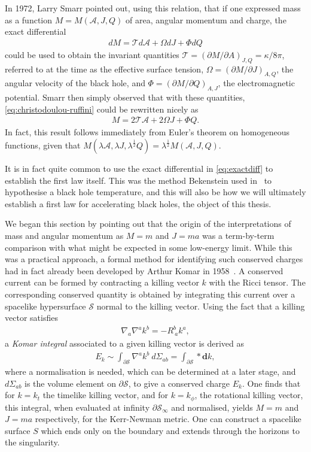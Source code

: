 \documentclass[
twoside,
openright,
frontopenright
]{dmathesis}
\begin{document}
In 1972, Larry Smarr pointed out, using this relation, that if one expressed
mass as a function $M=M(\mathcal{A},J,Q)$ of area, angular momentum and charge,
the exact differential
\begin{align}
  \label{eq:exactdiff}
dM = \mathcal{T}d\mathcal{A} + \Omega dJ + \Phi dQ
\end{align}
could be used to obtain the invariant quantities
$\mathcal{T} = (\partial M/\partial A)_{J,Q} = \kappa/8\pi$, referred to at the
time as the effective surface tension, $\Omega=(\partial M/\partial J)_{A,Q}$,
the angular velocity of the black hole, and
$\Phi = (\partial M/\partial Q)_{A,J}$, the electromagnetic potential. Smarr
then simply observed that with these quantities, \cref{eq:christodoulou-ruffini}
could be rewritten nicely as
\begin{align}
  \label{eq:smarrrelation}
  M = 2\mathcal{T}\mathcal{A} + 2\Omega J + \Phi Q.
\end{align}
In fact, this result follows immediately from Euler's theorem on homogeneous
functions, given that $M(\lambda\mathcal{A}, \lambda J, \lambda^\frac12 Q) =
\lambda^\frac12 M(\mathcal{A},J,Q)$.

It is in fact quite common to use the exact differential in \cref{eq:exactdiff}
to establish the first law itself. This was the method Bekenstein used
in~\cite{Bekenstein:1973ur} to hypothesise a black hole temperature, and this
will also be how we will ultimately establish a first law for accelerating black
holes, the object of this thesis. 

We began this section by pointing out that the origin of the interpretations of
mass and angular momentum as $M = m$ and $J = ma$ was a term-by-term comparison
with what might be expected in some low-energy limit. While this was a practical
approach, a formal method for identifying such conserved charges had in fact
already been developed by Arthur Komar in 1958~\cite{Komar:1959aa}. A conserved
current can be formed by contracting a killing vector $k$ with the Ricci
tensor. The corresponding conserved quantity is obtained by integrating this
current over a spacelike hypersurface $\mathcal{S}$ normal to the killing
vector. Using the fact that a killing vector satisfies
\begin{align}
  \label{eq:killing}
  \nabla_a \nabla^a k^b = -R^b_{~a}k^a,
\end{align}
a \emph{Komar integral} associated to a given killing vector is derived
as
\begin{align}
  \label{eq:komar}
  E_k\sim\int_{\partial\mathcal{S}} \nabla^a k^b ~ d\Sigma_{ab} = \int_{\partial\mathcal{S}} * \mathrm{\mathbf{d}}k,
\end{align}
where a normalisation is needed, which can be determined at a later stage, and
$d\Sigma_{ab}$ is the volume element on $\partial \mathcal{S}$, to give a
conserved charge $E_k$. One finds that for $k = k_t$ the timelike killing
vector, and for $k = k_\phi$, the rotational killing vector, this integral, when
evaluated at infinity $\partial \mathcal{S}_\infty$ and normalised, yields
$M = m$ and $J = m a$ respectively, for the Kerr-Newman metric. One can
construct a spacelike surface $S$ which ends only on the boundary and extends
through the horizons to the singularity.
\end{document}
